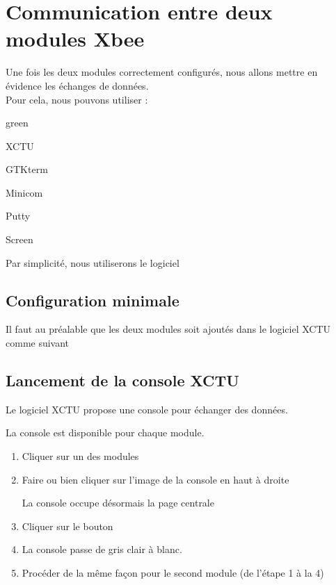 \section{Communication entre deux modules Xbee}

Une fois les deux modules correctement configurés, nous allons mettre en évidence les échanges de données.\\

Pour cela, nous pouvons utiliser :

\begin{items}{green}{\faLeaf}
 \item XCTU
\item  GTKterm
\item  Minicom
\item  Putty
\item  Screen
\end{items}

Par simplicité, nous utiliserons le logiciel 

\subsection{Configuration minimale}

Il faut au préalable que les deux modules soit ajoutés dans le logiciel XCTU comme suivant



\subsection{Lancement de la console XCTU}

Le logiciel XCTU propose une console pour échanger des données.

La console est disponible pour chaque module.

\begin{enumerate}
    
    \item Cliquer sur un des modules

    \item Faire  ou bien cliquer sur l'image de la console en haut à droite



La console occupe désormais la page centrale 


\item Cliquer sur le bouton 


\item La console passe de gris clair à blanc. 

\item Procéder de la même façon pour le second module (de l'étape 1 à la 4)
\end{enumerate}
